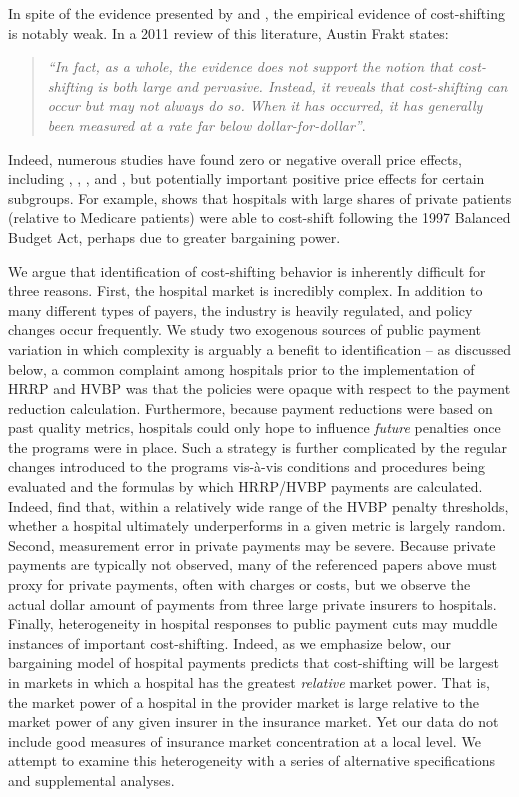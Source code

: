 \documentclass[12pt]{article}
\begin{document}
In spite of the evidence presented by \cite{cutler1998costshift} and \cite{zwanziger2006}, the empirical evidence of cost-shifting is notably weak.  In a 2011 review of this literature, Austin Frakt states:
\begin{quote}
\textit{``In fact, as a whole, the evidence does not support the notion that cost-shifting is both large and pervasive. Instead, it reveals that cost-shifting can occur but may not always do so. When it has occurred, it has generally been measured at a rate far below dollar-for-dollar''}.
\end{quote}

Indeed, numerous studies have found zero or negative overall price effects, including \cite{dranove2008impact}, \cite{wu2010}, \cite{frakt2014}, and \cite{dranove2017}, but potentially important positive price effects for certain subgroups.  For example, \cite{wu2010} shows that hospitals with large shares of private patients (relative to Medicare patients) were able to cost-shift following the 1997 Balanced Budget Act, perhaps due to greater bargaining power.

We argue that identification of cost-shifting behavior is inherently difficult for three reasons.  First, the hospital market is incredibly complex.  In addition to many different types of payers, the industry is heavily regulated, and policy changes occur frequently.  We study two exogenous sources of public payment variation in which complexity is arguably a benefit to identification -- as discussed below, a common complaint among hospitals prior to the implementation of HRRP and HVBP was that the policies were opaque with respect to the payment reduction calculation.  Furthermore, because payment reductions were based on past quality metrics, hospitals could only hope to influence \textit{future} penalties once the programs were in place. Such a strategy is further complicated by the regular changes introduced to the programs vis-\`a-vis conditions and procedures being evaluated and the formulas by which HRRP/HVBP payments are calculated. Indeed, \cite{friedson2016} find that, within a relatively wide range of the HVBP penalty thresholds, whether a hospital ultimately underperforms in a given metric is largely random. Second, measurement error in private payments may be severe.  Because private payments are typically not observed, many of the referenced papers above must proxy for private payments, often with charges or costs, but we observe the actual dollar amount of payments from three large private insurers to hospitals.  Finally, heterogeneity in hospital responses to public payment cuts may muddle instances of important cost-shifting.  Indeed, as we emphasize below, our bargaining model of hospital payments predicts that cost-shifting will be largest in markets in which a hospital has the greatest \textit{relative} market power.  That is, the market power of a hospital in the provider market is large relative to the market power of any given insurer in the insurance market.  Yet our data do not include good measures of insurance market concentration at a local level.  We attempt to examine this heterogeneity with a series of alternative specifications and supplemental analyses.
\end{document}
